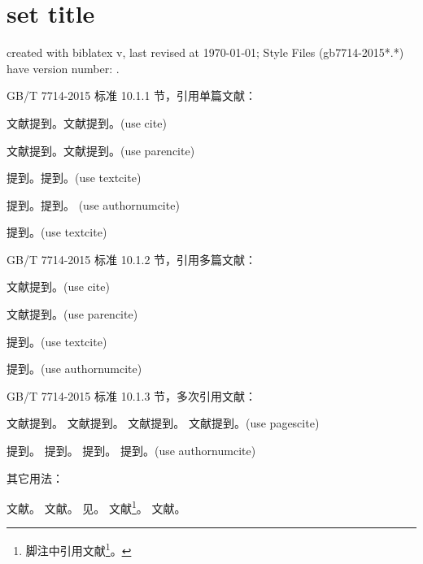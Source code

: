 \documentclass[twoside]{article}
\begin{document}
    \section{set title}
    created with biblatex v\versionofbiblatex, last revised at \today; Style Files (gb7714-2015*.*) have version number: \versionofgbtstyle.

\bigskip
    GB/T 7714-2015 标准 10.1.1 节，引用单篇文献：

    文献\cite{徐伟康2010对}提到。文献\cite{FOURNEY1971-17-38}提到。(use cite)\par
    文献\parencite{徐伟康2010对}提到。文献\parencite{FOURNEY1971-17-38}提到。(use parencite)\par
    \textcite{徐伟康2010对}提到。\textcite{FOURNEY1971-17-38}提到。(use textcite)\par
    提到。提到。
    (use authornumcite)\par
    \textcite{徐伟康2011}提到。(use textcite)

\bigskip
    GB/T 7714-2015 标准 10.1.2 节，引用多篇文献：

    文献\cite{杨光2015经济波动,Yi2013--}提到。(use cite)\par
    文献\parencite{杨光2015经济波动,Yi2013--}提到。(use parencite)\par
    \textcite{杨光2015经济波动,Yi2013--}提到。(use textcite)\par
    提到。(use authornumcite)\par


\bigskip
    GB/T 7714-2015 标准 10.1.3 节，多次引用文献：

    文献提到。
    文献提到。
    文献提到。
    文献提到。(use pagescite)\par
    提到。
    提到。
    提到。
    提到。(use authornumcite)\par

\bigskip
    其它用法：

    文献\cite[见][49页]{杨光2015经济波动}。
    文献\parencite[见][49页]{杨光2015经济波动}。
    见\citeauthor{杨光2015经济波动}\cite{杨光2015经济波动}。
    文献\footnote{脚注中引用文献\footcite{杨光2015经济波动}。}。
    文献。


    \printbibliography

    
\end{document}
